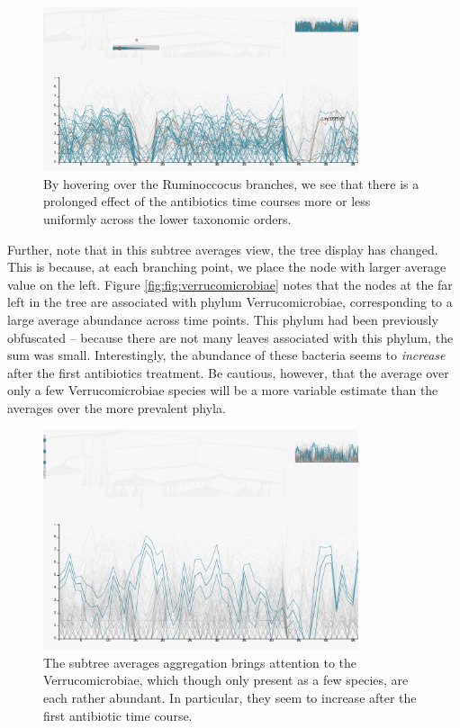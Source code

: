 \documentclass[12pt]{article}
\begin{document}
\begin{figure}

{\centering \includegraphics[width=350px]{figure/ruminococcus}

}

\caption{By hovering over the Ruminoccocus branches, we see that there is a prolonged effect of the antibiotics time courses more or less uniformly across the lower taxonomic orders.}\label{fig:ruminococcus}
\end{figure}

Further, note that in this subtree averages view, the tree display has changed.
This is because, at each branching point, we place the node with larger average
value on the left. Figure \ref{fig:fig:verrucomicrobiae} notes that the nodes at
the far left in the tree are associated with phylum Verrucomicrobiae,
corresponding to a large average abundance across time points. This phylum had
been previously obfuscated -- because there are not many leaves associated with
this phylum, the sum was small. Interestingly, the abundance of these bacteria
seems to \emph{increase} after the first antibiotics treatment. Be cautious,
however, that the average over only a few Verrucomicrobiae species will be a
more variable estimate than the averages over the more prevalent phyla.

\begin{figure}

{\centering \includegraphics[width=350px]{figure/verrucomicrobiae}

}

\caption{The subtree averages aggregation brings attention to the
  Verrucomicrobiae, which though only present as a few species, are each rather
  abundant. In particular, they seem to increase after the first antibiotic time
  course.}\label{fig:verrucomicrobiae}
\end{figure}
\end{document}
